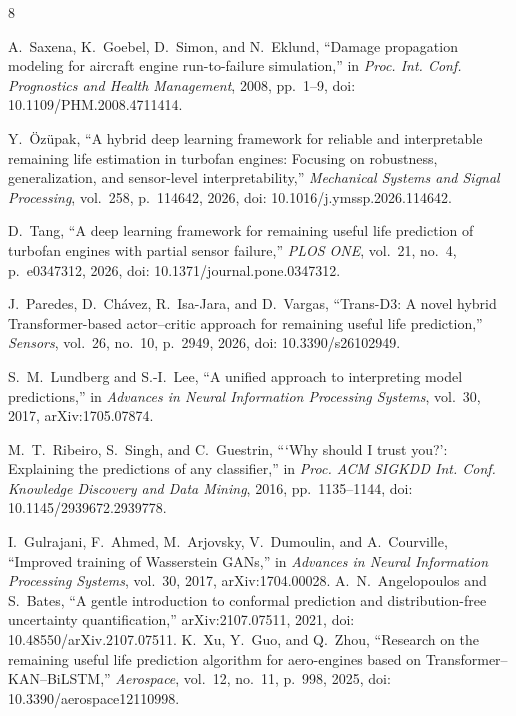 \documentclass[conference]{IEEEtran}
\begin{document}
\nocite{ozupak2026hybrid,tang2026deep,paredes2026trans}
\begin{thebibliography}{8}

A.~Saxena, K.~Goebel, D.~Simon, and N.~Eklund, ``Damage propagation modeling for aircraft engine run-to-failure simulation,'' in \emph{Proc. Int. Conf. Prognostics and Health Management}, 2008, pp.~1--9, doi: 10.1109/PHM.2008.4711414.

Y.~{\"O}z{\"u}pak, ``A hybrid deep learning framework for reliable and interpretable remaining life estimation in turbofan engines: Focusing on robustness, generalization, and sensor-level interpretability,'' \emph{Mechanical Systems and Signal Processing}, vol.~258, p.~114642, 2026, doi: 10.1016/j.ymssp.2026.114642.

D.~Tang, ``A deep learning framework for remaining useful life prediction of turbofan engines with partial sensor failure,'' \emph{PLOS ONE}, vol.~21, no.~4, p.~e0347312, 2026, doi: 10.1371/journal.pone.0347312.

J.~Paredes, D.~Ch{\'a}vez, R.~Isa-Jara, and D.~Vargas, ``Trans-D3: A novel hybrid Transformer-based actor--critic approach for remaining useful life prediction,'' \emph{Sensors}, vol.~26, no.~10, p.~2949, 2026, doi: 10.3390/s26102949.

S.~M.~Lundberg and S.-I.~Lee, ``A unified approach to interpreting model predictions,'' in \emph{Advances in Neural Information Processing Systems}, vol.~30, 2017, arXiv:1705.07874.

M.~T.~Ribeiro, S.~Singh, and C.~Guestrin, ```Why should I trust you?': Explaining the predictions of any classifier,'' in \emph{Proc. ACM SIGKDD Int. Conf. Knowledge Discovery and Data Mining}, 2016, pp.~1135--1144, doi: 10.1145/2939672.2939778.

I.~Gulrajani, F.~Ahmed, M.~Arjovsky, V.~Dumoulin, and A.~Courville, ``Improved training of Wasserstein GANs,'' in \emph{Advances in Neural Information Processing Systems}, vol.~30, 2017, arXiv:1704.00028.
A.~N.~Angelopoulos and S.~Bates, ``A gentle introduction to conformal prediction and distribution-free uncertainty quantification,'' arXiv:2107.07511, 2021, doi: 10.48550/arXiv.2107.07511.
K.~Xu, Y.~Guo, and Q.~Zhou, ``Research on the remaining useful life prediction algorithm for aero-engines based on Transformer--KAN--BiLSTM,'' \emph{Aerospace}, vol.~12, no.~11, p.~998, 2025, doi: 10.3390/aerospace12110998.
\end{thebibliography}
\end{document}
